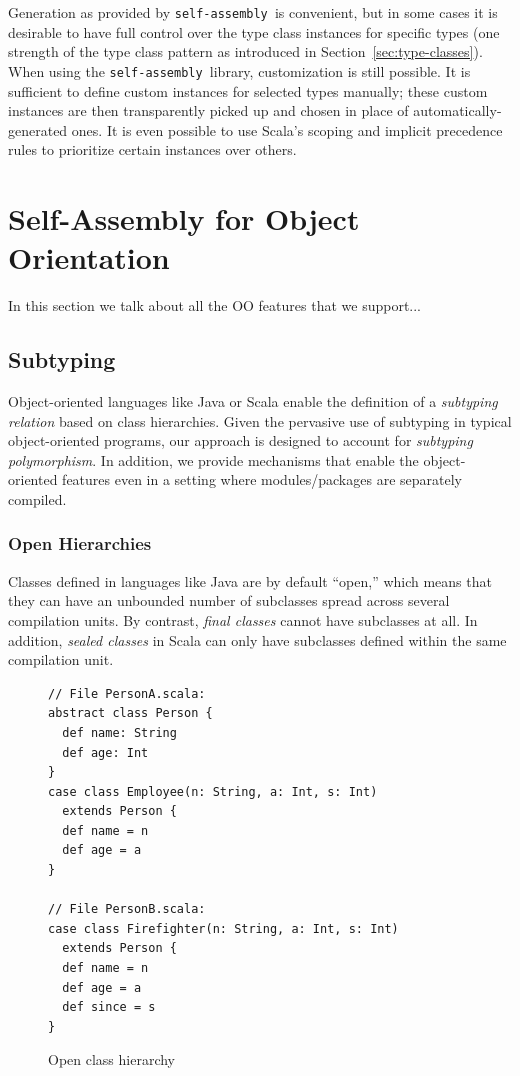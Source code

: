 \documentclass[preprint]{sigplanconf}
\newcommand{\selfassembly}{\texttt{self-assembly~}}
\begin{document}
Generation as provided by \selfassembly is convenient, but in some cases it is desirable
to have full control over the type class instances for specific types (one strength of the
type class pattern as introduced in Section~\ref{sec:type-classes}). When using the
\selfassembly library, customization is still possible. It is sufficient to define
custom instances for selected types manually; these custom instances are then transparently
picked up and chosen in place of automatically-generated ones. It is even possible to
use Scala's scoping and implicit precedence rules to prioritize certain instances over
others.

\section{Self-Assembly for Object Orientation}

In this section we talk about all the OO features that we support...

\subsection{Subtyping}

Object-oriented languages like Java or Scala enable the definition of a
\emph{subtyping relation} based on class hierarchies. Given the pervasive use
of subtyping in typical object-oriented programs, our approach is designed to
account for \emph{subtyping polymorphism}. In addition, we provide mechanisms
that enable the object-oriented features even in a setting where
modules/packages are separately compiled.

\subsubsection{Open Hierarchies}

Classes defined in languages like Java are by default ``open,'' which means
that they can have an unbounded number of subclasses spread across several
compilation units. By contrast, \emph{final classes} cannot have subclasses at
all. In addition, \emph{sealed classes} in Scala can only have subclasses
defined within the same compilation unit.

\begin{figure}
\centering
\begin{lstlisting}
// File PersonA.scala:
abstract class Person {
  def name: String
  def age: Int
}
case class Employee(n: String, a: Int, s: Int)
  extends Person {
  def name = n
  def age = a
}

// File PersonB.scala:
case class Firefighter(n: String, a: Int, s: Int)
  extends Person {
  def name = n
  def age = a
  def since = s
}
\end{lstlisting}
  \caption{Open class hierarchy}
  \label{fig:class-hierarchy}
\end{figure}
\end{document}
